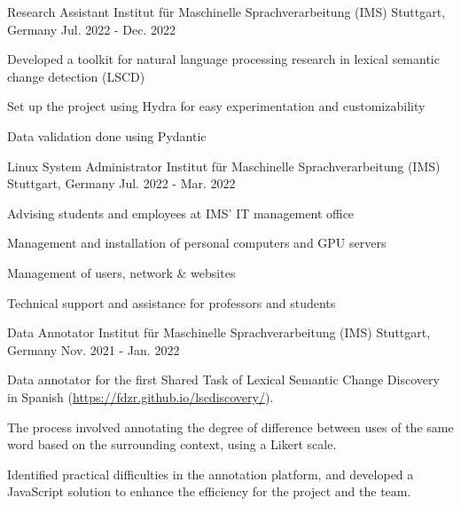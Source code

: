 \begin{cventries}
  \cventry
    {Research Assistant} %
    {Institut für Maschinelle Sprachverarbeitung (IMS)} %
    {Stuttgart, Germany} %
    {Jul. 2022 - Dec. 2022} %
    {
      \begin{cvitems} %
        \item Developed a toolkit for natural language processing research in lexical semantic change detection (LSCD)
        \item Set up the project using Hydra for easy experimentation and customizability
        \item Data validation done using Pydantic
      \end{cvitems}
    }

  \cventry
    {Linux System Administrator} %
    {Institut für Maschinelle Sprachverarbeitung (IMS)} %
    {Stuttgart, Germany} %
    {Jul. 2022 - Mar. 2022} %
    {
      \begin{cvitems} %
        \item Advising students and employees at IMS' IT management office
        \item Management and installation of personal computers and GPU servers
        \item Management of users, network \& websites
        \item Technical support and assistance for professors and students
      \end{cvitems}
    }

  \cventry
    {Data Annotator} %
    {Institut für Maschinelle Sprachverarbeitung (IMS)} %
    {Stuttgart, Germany} %
    {Nov. 2021 - Jan. 2022} %
    {
      \begin{cvitems} %
        \item Data annotator for the first Shared Task of Lexical Semantic Change Discovery in Spanish (\url{https://fdzr.github.io/lscdiscovery/}). 
        \item The process involved annotating the degree of difference between uses of the same word based on the surrounding context, using a Likert scale.
		\item Identified practical difficulties in the annotation platform, and developed a JavaScript solution to enhance the efficiency for the project and the team.
      \end{cvitems}
    }


\end{cventries}
